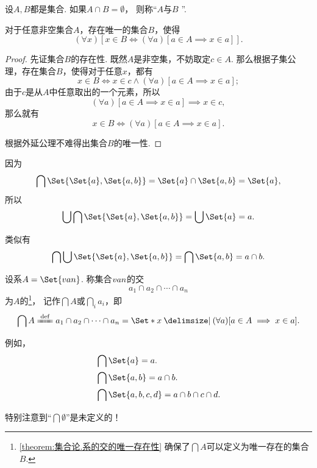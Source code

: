 \begin{definition}
设\(A,B\)都是集合.
如果\(A \cap B = \emptyset\)，
则称“\(A\)与\(B\) ”.
\end{definition}

\begin{theorem}\label{theorem:集合论.系的交的唯一存在性}
对于任意非空集合\(A\)，存在唯一的集合\(B\)，使得\[
	(\forall x)[x \in B \iff (\forall a)[a \in A \implies x \in a]].
\]
\begin{proof}
先证集合\(B\)的存在性.
既然\(A\)是非空集，不妨取定\(c \in A\).
那么根据子集公理，存在集合\(B\)，使得对于任意\(x\)，都有\[
	x \in B
	\iff
	x \in c \land (\forall a)[a \in A \implies x \in a];
\]
由于\(c\)是从\(A\)中任意取出的一个元素，所以\[
	(\forall a)[a \in A \implies x \in a]
	\implies
	x \in c,
\]
那么就有\[
	x \in B
	\iff
	(\forall a)[a \in A \implies x \in a].
\]

根据外延公理不难得出集合\(B\)的唯一性.
\end{proof}
\end{theorem}

\begin{example}
因为\[
	\bigcap\Set{\Set{a},\Set{a,b}}
	= \Set{a}\cap\Set{a,b}
	= \Set{a},
\]
所以\[
	\bigcup\bigcap\Set{\Set{a},\Set{a,b}}
	= \bigcup\Set{a}
	= a.
\]

类似有\[
	\bigcap\bigcup\Set{\Set{a},\Set{a,b}}
	= \bigcap\Set{a,b}
	= a \cap b.
\]
\end{example}

\begin{definition}
设系\(A = \Set{\v{a}{n}}\).
称集合\(v{a}{n}\)的交\[
	a_1 \cap a_2 \cap \dotsb \cap a_n
\]为\(A\)的\footnote{%
\cref{theorem:集合论.系的交的唯一存在性} 确保了\(\bigcap A\)可以定义为唯一存在的集合\(B\).
}，%
记作\(\bigcap A\)或\(\bigcap\limits_i a_i\)，即\[
	\bigcap A
	\defeq
	a_1 \cap a_2 \cap \dotsb \cap a_n
	= \Set*{ x \given (\forall a)[a \in A \implies x \in a] }.
\]
\end{definition}

例如，
\begin{align*}
	&\bigcap\Set{a} = a. \\
	&\bigcap\Set{a,b} = a \cap b. \\
	&\bigcap\Set{a,b,c,d} = a \cap b \cap c \cap d.
\end{align*}

特别注意到“\(\bigcap\emptyset\)”是未定义的！

